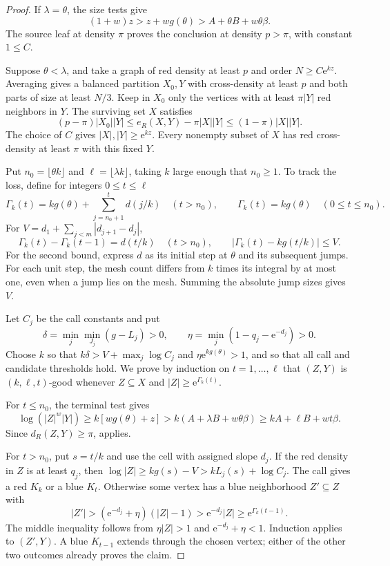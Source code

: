 \documentclass[10pt,a4paper]{amsart}
\newcommand{\e}{\mathrm e}
\begin{document}
\begin{proof}
If $\lambda=\theta$, the size tests give
\[
 (1+w)z>z+wg(\theta)>A+\theta B+w\theta\beta.
\]
The source leaf at density $\pi$ proves the conclusion at density $p>\pi$, with constant $1\le C$.

Suppose $\theta<\lambda$, and take a graph of red density at least $p$ and order $N\ge C\e^{kz}$.
Averaging gives a balanced partition $X_0,Y$ with cross-density at least $p$ and both parts of size at least $N/3$.
Keep in $X_0$ only the vertices with at least $\pi|Y|$ red neighbors in $Y$.
The surviving set $X$ satisfies
\[
 (p-\pi)|X_0||Y|
 \le e_R(X,Y)-\pi|X||Y|
 \le(1-\pi)|X||Y|.
\]
The choice of $C$ gives $|X|,|Y|\ge\e^{kz}$.
Every nonempty subset of $X$ has red cross-density at least $\pi$ with this fixed $Y$.

Put $n_0=\lfloor\theta k\rfloor$ and $\ell=\lfloor\lambda k\rfloor$, taking $k$ large enough that $n_0\ge1$.
To track the loss, define for integers $0\le t\le\ell$
\[
 \Gamma_k(t)=kg(\theta)+\sum_{j=n_0+1}^{t}d(j/k)\quad(t>n_0),
 \qquad \Gamma_k(t)=kg(\theta)\quad(0\le t\le n_0).
\]
For $V=d_1+\sum_{j<m}|d_{j+1}-d_j|$,
\begin{equation}\label{eq:discrete}
 \Gamma_k(t)-\Gamma_k(t-1)=d(t/k)\quad(t>n_0),\qquad
 |\Gamma_k(t)-kg(t/k)|\le V.
\end{equation}
For the second bound, express $d$ as its initial step at $\theta$ and its subsequent jumps.
For each unit step, the mesh count differs from $k$ times its integral by at most one, even when a jump lies on the mesh.
Summing the absolute jump sizes gives $V$.

Let $C_j$ be the call constants and put
\[
 \delta=\min_j\min_{J_j}(g-L_j)>0,\qquad
 \eta=\min_j(1-q_j-\e^{-d_j})>0.
\]
Choose $k$ so that $k\delta>V+\max_j\log C_j$ and $\eta\e^{kg(\theta)}>1$, and so that all call and candidate thresholds hold.
We prove by induction on $t=1,\ldots,\ell$ that $(Z,Y)$ is $(k,\ell,t)$-good whenever $Z\subseteq X$ and $|Z|\ge\e^{\Gamma_k(t)}$.

For $t\le n_0$, the terminal test gives
\[
 \log(|Z|^w|Y|)\ge k[wg(\theta)+z]
 >k(A+\lambda B+w\theta\beta)
 \ge kA+\ell B+wt\beta.
\]
Since $d_R(Z,Y)\ge\pi$,  applies.

For $t>n_0$, put $s=t/k$ and use the cell with assigned slope $d_j$.
If the red density in $Z$ is at least $q_j$, then
$\log|Z|\ge kg(s)-V>kL_j(s)+\log C_j$.
The call gives a red $K_k$ or a blue $K_t$.
Otherwise some vertex has a blue neighborhood $Z'\subseteq Z$ with
\[
 |Z'|>(\e^{-d_j}+\eta)(|Z|-1)>\e^{-d_j}|Z|
 \ge\e^{\Gamma_k(t-1)}.
\]
The middle inequality follows from $\eta|Z|>1$ and $\e^{-d_j}+\eta<1$.
Induction applies to $(Z',Y)$.
A blue $K_{t-1}$ extends through the chosen vertex; either of the other two outcomes already proves the claim.


\end{proof}
\end{document}
